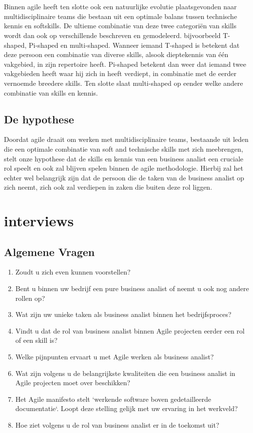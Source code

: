 \documentclass{hogent-article}
\begin{document}
\\~~\\
Binnen agile heeft ten slotte ook een natuurlijke evolutie plaatsgevonden naar multidisciplinaire teams die bestaan uit een optimale balans tussen technische kennis en softskills. De ultieme combinatie van deze twee categoriën van skills wordt dan ook op verschillende beschreven en gemodeleerd. bijvoorbeeld T-shaped, Pi-shaped en multi-shaped. Wanneer iemand T-shaped is betekent dat deze persoon een combinatie van diverse skills, alsook dieptekennis van één vakgebied, in zijn repertoire heeft. Pi-shaped betekent dan weer dat iemand twee vakgebieden heeft waar hij zich in heeft verdiept, in combinatie met de eerder vernoemde breedere skills. Ten slotte slaat multi-shaped op eender welke andere combinatie van skills en kennis.\autocite{heijnerelevante}

\subsection{De hypothese}

Doordat agile draait om werken met multidisciplinaire teams, bestaande uit leden die een optimale combinatie van soft and technische skills met zich meebrengen, stelt onze hypothese dat de skills en kennis van een business analist een cruciale rol speelt en ook zal blijven spelen binnen de agile methodologie. Hierbij zal het echter wel belangrijk zijn dat de persoon die de taken van de business analist op zich neemt, zich ook zal verdiepen in zaken die buiten deze rol liggen.

\newpage

\section{interviews}
\subsection{Algemene Vragen}

\begin{enumerate}
  \item Zoudt u zich even kunnen voorstellen?
  \item Bent u binnen uw bedrijf een pure business analist of neemt u ook nog andere rollen op?
  \item Wat zijn uw unieke taken als business analist binnen het bedrijfsproces?
  \item Vindt u dat de rol van business analist binnen Agile projecten eerder een rol of een skill is?
  \item Welke pijnpunten ervaart u met Agile werken als business analist?
  \item Wat zijn volgens u de belangrijkste kwaliteiten die een business analist in Agile projecten moet over beschikken?
  \item Het Agile manifesto stelt `werkende software boven gedetailleerde documentatie`. Loopt deze stelling gelijk met uw ervaring in het werkveld?
  \item Hoe ziet volgens u de rol van business analist er in de toekomst uit?
\end{enumerate}
\end{document}
